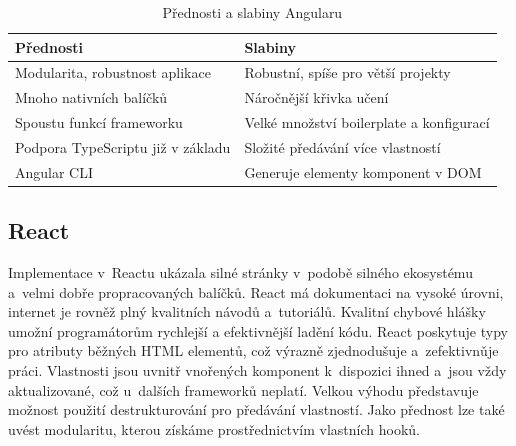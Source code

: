 \begin{table}[htb]
	\centering
	\caption{Přednosti a slabiny Angularu}
	\medskip
	\radkovani[1.2]
		\begin{tabular}{|l|l|}
		\hline
		\textbf{Přednosti}									& \textbf{Slabiny}                    			\\ \hline
		Modularita, robustnost aplikace			& Robustní, spíše pro větší projekty				\\ \hline
		Mnoho nativních balíčků							& Náročnější křivka učení										\\ \hline
		Spoustu funkcí frameworku						& Velké množství boilerplate a konfigurací	\\ \hline
		Podpora TypeScriptu již v základu		& Složité předávání více vlastností					\\ \hline
		Angular CLI													& Generuje elementy komponent v DOM					\\ \hline
		\end{tabular}
	\label{tab:angulartabulka}
\end{table}


\subsection*{React}

Implementace v~Reactu ukázala silné stránky v~podobě silného ekosystému a~velmi dobře propracovaných balíčků. 
React má dokumentaci na vysoké úrovni, internet je rovněž plný kvalitních návodů a~tutoriálů. 
Kvalitní chybové hlášky umožní programátorům rychlejší a efektivnější ladění kódu. 
React poskytuje typy pro atributy běžných HTML elementů, což výrazně zjednodušuje a~zefektivnǔje práci. 
Vlastnosti jsou uvnitř vnořených komponent k~dispozici ihned a~jsou vždy aktualizované, což u~dalších frameworků neplatí. 
Velkou výhodu představuje možnost použití destrukturování pro předávání vlastností. 
Jako přednost lze také uvést modularitu, kterou získáme prostřednictvím vlastních hooků. 

